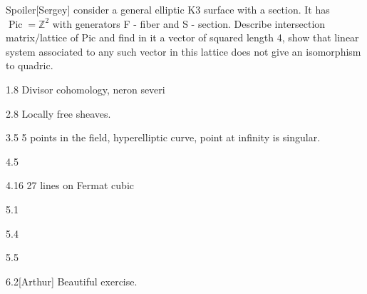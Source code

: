 \begin{thing4}{Spoiler}[Sergey]\leavevmode
consider a general elliptic K3 surface with a section. It has $\operatorname{Pic} = \mathbb{Z}^2$ with generators F - fiber and S - section. Describe intersection matrix/lattice of Pic and find in it a vector of squared length 4, show that linear system associated to any such vector in this lattice does not give an isomorphism to quadric.
\end{thing4}



\begin{manualexercise}{1.8}
	Divisor cohomology, neron severi
\end{manualexercise}

\begin{manualexercise}{2.8}
	Locally free sheaves.
\end{manualexercise}

\begin{manualexercise}{3.5}
	5 points in the field, hyperelliptic curve, point at infinity is singular.
\end{manualexercise}

\begin{manualexercise}{4.5}
	
\end{manualexercise}

\begin{manualexercise}{4.16}
	27 lines on Fermat cubic
\end{manualexercise}

\begin{manualexercise}{5.1}
	
\end{manualexercise}

\begin{manualexercise}{5.4}
	
\end{manualexercise}

\begin{manualexercise}{5.5}
	
\end{manualexercise}

\begin{manualexercise}{6.2}[Arthur]
	Beautiful exercise.
\end{manualexercise}

\printbibliography

